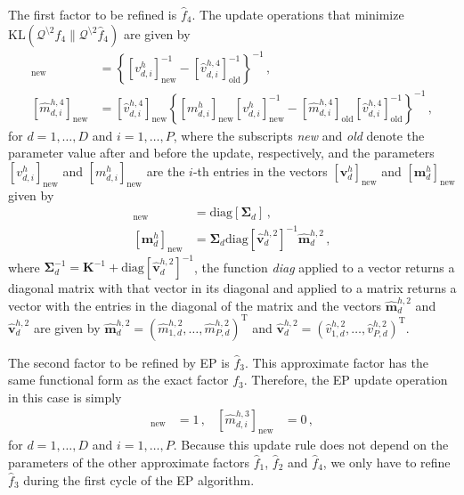 The first factor to be refined is $\hat{f}_4$. The update operations that minimize
$\text{KL}(\mathcal{Q}^{\setminus 2} f_4 \| \mathcal{Q}^{\setminus 2} \hat{f}_4)$ are given by
\begin{align}
[\hat{v}_{d,i}^{h,4}]_\text{new} & =
\left\{ [v_{d,i}^{h}]_\text{new}^{-1} - [\hat{v}_{d,i}^{h,4} ]_\text{old}^{-1}\right\}^{-1}\,,\\
[\hat{m}_{d,i}^{h,4}]_\text{new} & =
[\hat{v}_{d,i}^{h,4}]_\text{new} \left\{[ m_{d,i}^{h}]_\text{new} 
[v_{d,i}^{h}]_\text{new}^{-1} - [\hat{m}_{d,i}^{h,4}]_\text{old} [\hat{v}_{d,i}^{h,4}]_\text{old}^{-1}\right\}^{-1}\,,
\end{align}
for $d = 1,\ldots,D$ and $i = 1,\ldots,P$,
where the subscripts \emph{new} and \emph{old} denote the parameter value after and before the update, respectively, and
the parameters $[v_{d,i}^{h}]_\text{new}$ and $[ m_{d,i}^{h}]_\text{new}$ are the $i$-th entries in the vectors
$[\mathbf{v}_{d}^{h}]_\text{new}$ and $[\mathbf{m}_{d}^{h}]_\text{new}$ given by
\begin{align}
[\mathbf{v}_{d}^{h}]_\text{new} & = \text{diag}\left[ \bm \Sigma_d \right]\,,\label{eq:Sigma} \\
[\mathbf{m}_{d}^{h}]_\text{new} & = \bm \Sigma_d \text{diag}[\hat{\mathbf{v}}_d^{h,2}]^{-1} \hat{\mathbf{m}}_d^{h,2}\label{eq:Sigma2}\,,
\end{align}
where $\bm \Sigma_d^{-1} = \mathbf{K}^{-1} + \text{diag}[\hat{\mathbf{v}}_d^{h,2}]^{-1}$,
the function \emph{diag} applied to a vector returns a diagonal matrix with that vector in
its diagonal and applied to a matrix returns a vector with the entries in the diagonal of the matrix and the vectors
$\hat{\mathbf{m}}_d^{h,2}$ and $\hat{\mathbf{v}}_d^{h,2}$ are given by
$\hat{\mathbf{m}}_d^{h,2}=(\hat{m}_{1,d}^{h,2},\ldots,\hat{m}_{P,d}^{h,2})^\text{T}$ and
$\hat{\mathbf{v}}_d^{h,2}=(\hat{v}_{1,d}^{h,2},\ldots,\hat{v}_{P,d}^{h,2})^\text{T}$.

The second factor to be refined by EP is $\hat{f}_3$. This approximate factor has the same functional form as the exact factor $f_3$. Therefore,
the EP update operation in this case is simply
\begin{align}
[\hat{v}_{d,i}^{h,3}]_\text{new} & = 1\,, & [\hat{m}_{d,i}^{h,3}]_\text{new} & = 0\,,
\end{align}
for $d = 1,\ldots,D$ and $i = 1,\ldots,P$. Because this update rule does not depend on the parameters of the other approximate factors $\hat{f}_1$,
$\hat{f}_2$ and $\hat{f}_4$, we only have to refine $\hat{f}_3$ during the first cycle of the EP algorithm.

